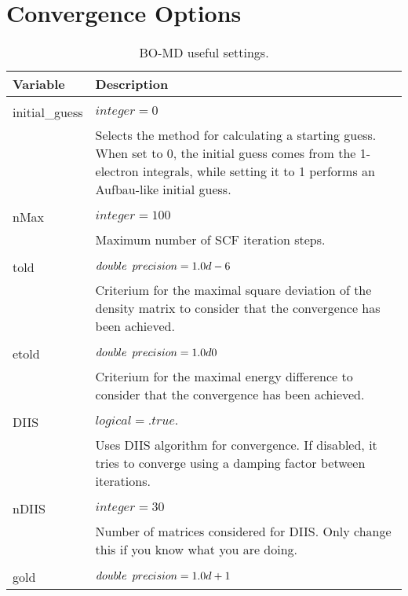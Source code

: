 \section{Convergence Options}
\begin{Spacing}{1.0}
   \begin{longtable}{ p{} p{} }
   
      \toprule
      \textbf{Variable} & Description \\*
      \midrule \\*
      \endhead
   
      \bottomrule
      \caption{BO-MD useful settings.}
      \endfoot
         initial\_guess & $ integer = 0 $ \\
         & Selects the method for calculating a starting guess. When set to
         0, the initial guess comes from the 1-electron integrals, while
         setting it to 1 performs an Aufbau-like initial guess. \\
         \\
         nMax & $ integer = 100 $ \\
         & Maximum number of SCF iteration steps.\\
         \\
         told  & $ double \hspace{0.5em} precision = 1.0d-6 $ \\
         & Criterium for the maximal square deviation of the density matrix to 
         consider that the convergence has been achieved. \\
         \\
         etold & $ double \hspace{0.5em} precision = 1.0d0 $ \\
         & Criterium for the maximal energy difference to consider that the
         convergence has been achieved. \\
         \\
         DIIS  & $ logical = .true. $\\
         & Uses DIIS algorithm for convergence. If disabled, it tries to
         converge using a damping factor between iterations. \\
         \\
         nDIIS & $ integer = 30 $ \\
         & Number of matrices considered for DIIS. Only change this if you know
         what you are doing. \\
         \\
         gold & $ double \hspace{0.5em} precision = 1.0d+1 $\\

\end{longtable}
\end{Spacing}
